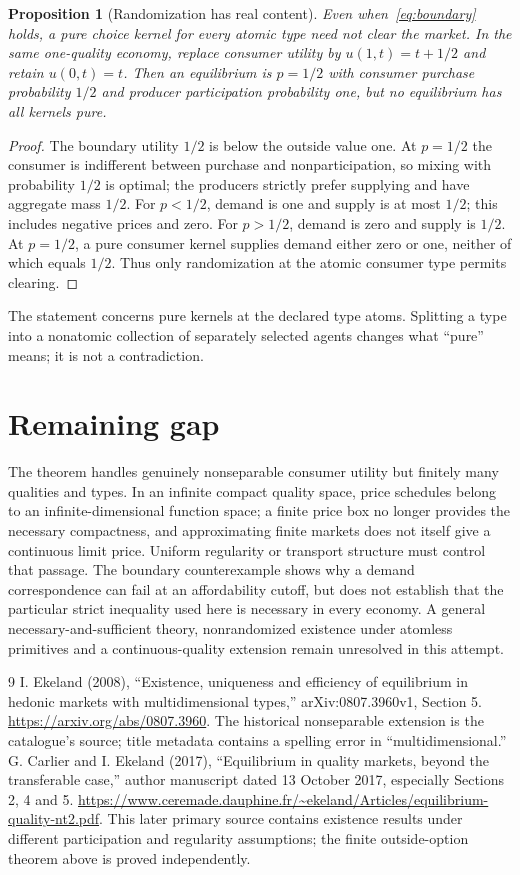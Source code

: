 \documentclass[11pt,a4paper]{article}
\newtheorem{proposition}[theorem]{Proposition}
\theoremstyle{definition}
\theoremstyle{remark}
\begin{document}
\begin{proposition}[Randomization has real content]
Even when~\eqref{eq:boundary} holds, a pure choice kernel for every atomic type need not clear the market. In the same one-quality economy, replace consumer utility by $u(1,t)=t+1/2$ and retain $u(0,t)=t$. Then an equilibrium is $p=1/2$ with consumer purchase probability $1/2$ and producer participation probability one, but no equilibrium has all kernels pure.
\end{proposition}
\begin{proof}
The boundary utility $1/2$ is below the outside value one. At $p=1/2$ the consumer is indifferent between purchase and nonparticipation, so mixing with probability $1/2$ is optimal; the producers strictly prefer supplying and have aggregate mass $1/2$. For $p<1/2$, demand is one and supply is at most $1/2$; this includes negative prices and zero. For $p>1/2$, demand is zero and supply is $1/2$. At $p=1/2$, a pure consumer kernel supplies demand either zero or one, neither of which equals $1/2$. Thus only randomization at the atomic consumer type permits clearing.
\end{proof}

The statement concerns pure kernels at the declared type atoms. Splitting a type into a nonatomic collection of separately selected agents changes what ``pure'' means; it is not a contradiction.

\section{Remaining gap}
The theorem handles genuinely nonseparable consumer utility but finitely many qualities and types. In an infinite compact quality space, price schedules belong to an infinite-dimensional function space; a finite price box no longer provides the necessary compactness, and approximating finite markets does not itself give a continuous limit price. Uniform regularity or transport structure must control that passage. The boundary counterexample shows why a demand correspondence can fail at an affordability cutoff, but does not establish that the particular strict inequality used here is necessary in every economy. A general necessary-and-sufficient theory, nonrandomized existence under atomless primitives and a continuous-quality extension remain unresolved in this attempt.

\begin{thebibliography}{9}
 I. Ekeland (2008), ``Existence, uniqueness and efficiency of equilibrium in hedonic markets with multidimensional types,'' arXiv:0807.3960v1, Section 5. \url{https://arxiv.org/abs/0807.3960}. The historical nonseparable extension is the catalogue's source; title metadata contains a spelling error in ``multidimensional.''
 G. Carlier and I. Ekeland (2017), ``Equilibrium in quality markets, beyond the transferable case,'' author manuscript dated 13 October 2017, especially Sections 2, 4 and 5. \url{https://www.ceremade.dauphine.fr/~ekeland/Articles/equilibrium-quality-nt2.pdf}. This later primary source contains existence results under different participation and regularity assumptions; the finite outside-option theorem above is proved independently.
\end{thebibliography}
\end{document}
